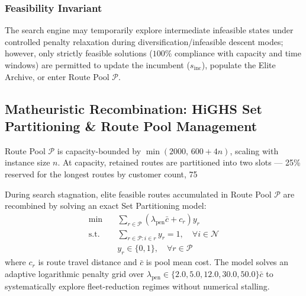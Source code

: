 \documentclass{ieeeaccess}
\begin{document}
\subsubsection{Feasibility Invariant}
The search engine may temporarily explore intermediate infeasible states under controlled penalty relaxation during diversification/infeasible descent modes; however, only strictly feasible solutions ($100\%$ compliance with capacity and time windows) are permitted to update the incumbent ($s_{\text{inc}}$), populate the Elite Archive, or enter Route Pool $\mathcal{P}$.

\subsection{Matheuristic Recombination: HiGHS Set Partitioning \& Route Pool Management}
\label{sec:set_partitioning}

Route Pool $\mathcal{P}$ is capacity-bounded by $\min(2000,\,600+4n)$, scaling with instance size $n$. At capacity, retained routes are partitioned into two slots — 25\% reserved for the longest routes by customer count, 75%

During search stagnation, elite feasible routes accumulated in Route Pool $\mathcal{P}$ are recombined by solving an exact Set Partitioning model:
\begin{align}
  \min \quad &\sum_{r \in \mathcal{P}} \left( \lambda_{\text{pen}} \bar{c} + c_r \right) y_r \label{eq:sp_obj} \\
  \text{s.t.} \quad &\sum_{r \in \mathcal{P} : i \in r} y_r = 1, \quad \forall i \in \mathcal{N} \label{eq:sp_cover} \\
  &y_r \in \{0, 1\}, \quad \forall r \in \mathcal{P} \label{eq:sp_binary}
\end{align}
where $c_r$ is route travel distance and $\bar{c}$ is pool mean cost. The model solves an adaptive logarithmic penalty grid over $\lambda_{\text{pen}} \in \{2.0, 5.0, 12.0, 30.0, 50.0\}\bar{c}$ to systematically explore fleet-reduction regimes without numerical stalling.
\end{document}
